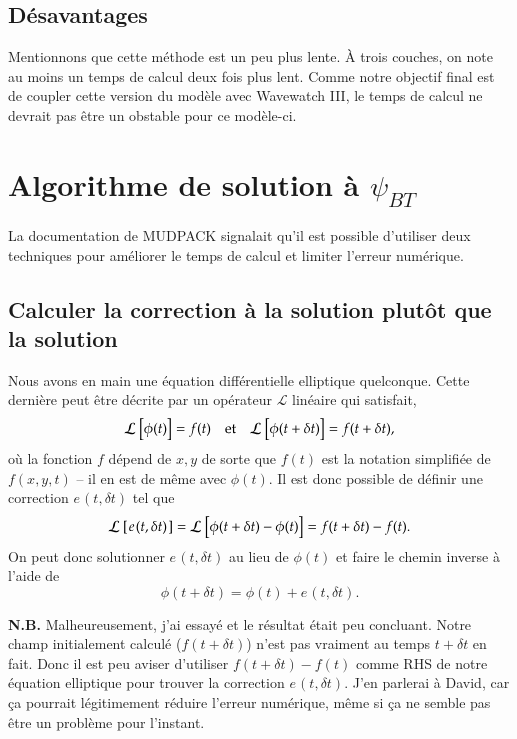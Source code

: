 \documentclass[10pt]{article}
\numberwithin{equation}{section}
\newcommand{\pt}{\hspace{1pt}}
\begin{document}
\subsection{Désavantages}
\label{sec:orgfe420b8}
Mentionnons que cette méthode est un peu plus lente.
À trois couches, on note au moins un temps de calcul deux fois plus lent.
Comme notre objectif final est de coupler cette version du modèle avec Wavewatch III, le temps de calcul ne devrait pas être un obstable pour ce modèle-ci. 



\section{Algorithme de solution à \(\psi_{BT}\)}
\label{sec:org9bc6c9c}

La documentation de MUDPACK signalait qu'il est possible d'utiliser deux techniques pour améliorer le temps de calcul et limiter l'erreur numérique.

\subsection{Calculer la correction à la solution plutôt que la solution}
\label{sec:org60c02bc}
Nous avons en main une équation différentielle elliptique quelconque.
Cette dernière peut être décrite par un opérateur \(\mathcal{L}\) linéaire qui satisfait,
\begin{align}
&&\mathcal{L}\ \qty[\phi(t)] = f(t) && \text{et} && \mathcal{L}\ \qty[\phi(t+\delta t)] = f(t+\delta t), &&
\end{align}
où la fonction \(f\) dépend de \(x,y\) de sorte que \(f(t)\) est la notation simplifiée de \(f(x,y,t)\) -- il en est de même avec \(\phi(t)\).
Il est donc possible de définir une correction \(e\pt(t,\delta t)\) tel que
\begin{align}
\mathcal{L}\ \qty[\pt e\pt(t,\delta t)\pt ] = \mathcal{L}\ \qty[ \phi(t+\delta t) - \phi(t) ] = f(t+\delta t) - f(t).
\end{align}
On peut donc solutionner \(e\pt(t,\delta t)\) au lieu de \(\phi(t)\) et faire le chemin inverse à l'aide de
\begin{equation}
\phi(t+\delta t) = \phi(t) + e\pt(t,\delta t).
\end{equation}

\textbf{N.B.} Malheureusement, j'ai essayé et le résultat était peu concluant.
Notre champ initialement calculé (\(f(t+\delta t)\)) n'est pas vraiment au temps \(t+\delta t\) en fait.
Donc il est peu aviser d'utiliser \(f(t+\delta t) - f(t)\) comme RHS de notre équation elliptique pour trouver la correction \(e\pt(t,\delta t)\).
J'en parlerai à David, car ça pourrait légitimement réduire l'erreur numérique, même si ça ne semble pas être un problème pour l'instant.
\end{document}
